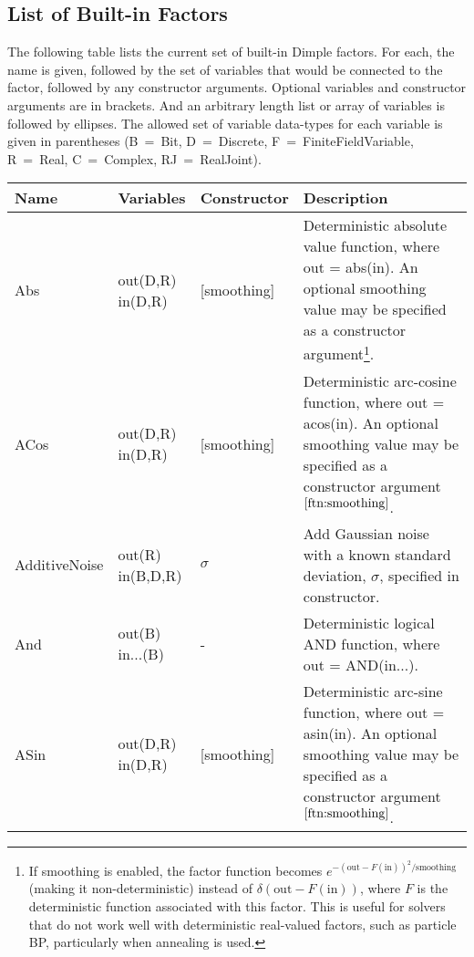 \subsection{List of Built-in Factors}
\label{sec:builtInFactors}

The following table lists the current set of built-in Dimple factors.  For each, the name is given, followed by the set of variables that would be connected to the factor, followed by any constructor arguments.  Optional variables and constructor arguments are in brackets.  And an arbitrary length list or array of variables is followed by ellipses.  The allowed set of variable data-types for each variable is given in parentheses (B~=~Bit, D~=~Discrete, F~=~FiniteFieldVariable, R~=~Real, C~=~Complex, RJ~=~RealJoint).

\begin{longtable} {p{3.5cm} p{2.2cm} p{2cm} p{7cm}}
Name & Variables & Constructor & Description \\
\hline
\endhead
%
Abs & out(D,R) \newline in(D,R) & [smoothing] & Deterministic absolute value function, where out = abs(in).  An optional smoothing value may be specified as a constructor argument\footnote{\label{ftn:smoothing}If smoothing is enabled, the factor function becomes $e^{-(\textrm{out} - F(\textrm{in}))^2/\textrm{smoothing}}$ (making it non-deterministic) instead of $\delta(\textrm{out} - F(\textrm{in}))$, where $F$ is the deterministic function associated with this factor.  This is useful for solvers that do not work well with deterministic real-valued factors, such as particle BP, particularly when annealing is used.}.\\
%
ACos & out(D,R) \newline in(D,R) & [smoothing] & Deterministic arc-cosine function, where out = acos(in). An optional smoothing value may be specified as a constructor argument$^{\ref{ftn:smoothing}}$. \\
%
AdditiveNoise & out(R) \newline in(B,D,R) & $\sigma$ & Add Gaussian noise with a known standard deviation, $\sigma$, specified in constructor. \\
%
And & out(B) \newline in...(B) & - & Deterministic logical AND function, where out = AND(in...). \\
%
ASin & out(D,R) \newline in(D,R) & [smoothing] & Deterministic arc-sine function, where out = asin(in). An optional smoothing value may be specified as a constructor argument$^{\ref{ftn:smoothing}}$. \\

\end{longtable}
